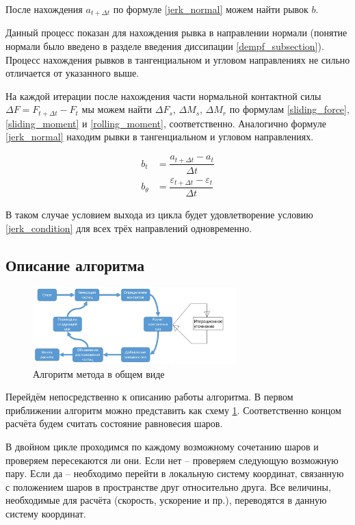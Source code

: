 \documentclass[a4paper]{article}
\begin{document}
После нахождения $a_{t + \Delta t}$ по формуле \ref{jerk_normal} можем найти рывок $b$.

Данный процесс показан для нахождения рывка в направлении нормали (понятие нормали было введено в разделе введения  диссипации \ref{dempf_subsection}). 
Процесс нахождения рывков в тангенциальном и угловом направлениях не сильно отличается от указанного выше.

На каждой итерации после нахождения части нормальной контактной силы $\Delta F = F_{t+\Delta t} - F_t$  мы можем найти $\Delta F_s$, $\Delta M_s$, $\Delta M_r$ по формулам \ref{sliding_force}, \ref{sliding_moment} и \ref{rolling_moment}, соответственно.
Аналогично формуле \ref{jerk_normal} находим рывки в тангенциальном и угловом направлениях.

\begin{align}
b_t &= \dfrac{a_{t + \Delta t} - a_{t}}{\Delta t} \label{jerk_tangent}\\
b_{\theta} &= \dfrac{\varepsilon_{t + \Delta t} - \varepsilon_{t}}{\Delta t} \label{jerk_angular}
\end{align}

В таком случае условием выхода из цикла будет удовлетворение условию \ref{jerk_condition} для всех трёх направлений одновременно.


\subsection{Описание алгоритма}

\begin{figure}[h!]
	\centering
	\label{pic:algo}
	\includegraphics[width=0.7\textwidth]{algorithm}
	\caption{Алгоритм метода в общем виде}
\end{figure} 
    
Перейдём непосредственно к описанию работы алгоритма.
В первом приближении алгоритм можно представить как схему \ref{pic:algo}. Соответственно концом расчёта будем считать состояние равновесия шаров.

В двойном цикле проходимся по каждому возможному сочетанию шаров и проверяем пересекаются ли они.
Если нет -- проверяем следующую возможную пару.
Если да -- необходимо перейти в локальную систему координат, связанную с положением шаров в пространстве друг относительно друга. Все величины, необходимые для расчёта (скорость, ускорение и пр.), переводятся в данную систему координат.
\end{document}
